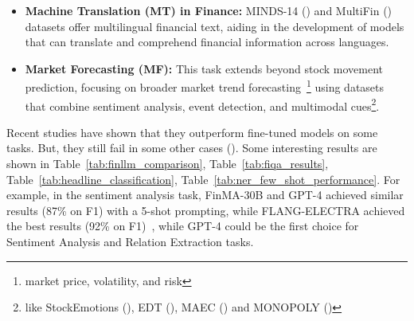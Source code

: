 \begin{itemize}
	\item \textbf{Machine Translation (MT) in Finance:} MINDS-14 (\textcite{gerz2021multilingual}) and MultiFin (\textcite{jorgensen2023multifin}) datasets offer multilingual financial text, aiding in the development of models that can translate and comprehend financial information across languages.
	\item \textbf{Market Forecasting (MF):} This task extends beyond stock movement prediction, focusing on broader market trend forecasting~\footnote{market price, volatility, and risk} using datasets that combine sentiment analysis, event detection, and multimodal cues\footnote{like StockEmotions (\textcite{lee2023stockemotions}), EDT (\textcite{zhou2021trade}), MAEC (\textcite{li2020maec}) and MONOPOLY (\textcite{mathur2022monopoly})}.
\end{itemize}

Recent studies have shown that they outperform fine-tuned models on some tasks.
But, they still fail in some other cases (\textcite{li2023chatgpt}).
Some interesting results are shown in Table~\ref{tab:finllm_comparison}, Table~\ref{tab:fiqa_results}, Table~\ref{tab:headline_classification}, Table~\ref{tab:ner_few_shot_performance}.
For example, in the sentiment analysis task, FinMA-30B and GPT-4 achieved similar results (87\% on F1) with a 5-shot prompting, while FLANG-ELECTRA achieved the best results (92\% on F1)~\textcite{lee2024survey}, while GPT-4 could be the first choice for Sentiment Analysis and Relation Extraction tasks.


